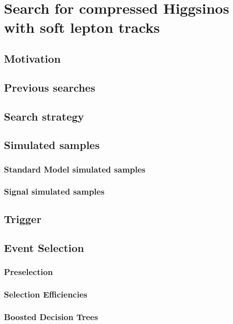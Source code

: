 \chapter{Search for compressed Higgsinos  with soft
lepton tracks}

\section{Motivation}

\section{Previous searches}




\section{Search strategy}
\label{sec:search-strategy}

\section{Simulated samples}
\subsection{Standard Model simulated samples}
\subsection{Signal simulated samples}




\section{Trigger}
\label{sec:trigger}

\section{Event Selection}
\subsection{Preselection}
\subsection{Selection Efficiencies}
\subsection{Boosted Decision Trees}

